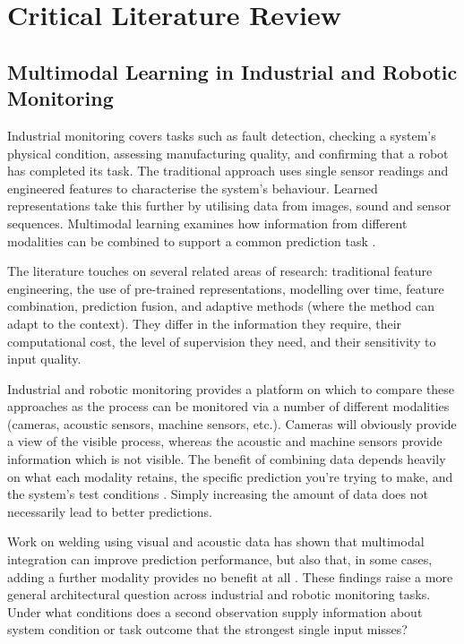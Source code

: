 \chapter{Critical Literature Review}

\label{ch:literature}

\section*{Multimodal Learning in Industrial and Robotic Monitoring}


Industrial monitoring covers tasks such as fault detection, checking a system's physical condition,
assessing manufacturing quality, and confirming that a robot has completed its task. The traditional
approach uses single sensor readings and engineered features to characterise the system's behaviour.
Learned representations take this further by utilising data from images, sound and sensor sequences.
Multimodal learning examines how information from different modalities can be combined to support a
common prediction task \parencite{baltrusaitis_multimodal_2019,huo_multisensor_2022,thoduka_multimodal_2024}.

The literature touches on several related areas of research: traditional feature engineering, the
use of pre-trained representations, modelling over time, feature combination, prediction fusion, and
adaptive methods (where the method can adapt to the context). They differ in the information they
require, their computational cost, the level of supervision they need, and their sensitivity to
input quality.

Industrial and robotic monitoring provides a platform on which to compare these approaches as the
process can be monitored via a number of different modalities (cameras, acoustic sensors, machine
sensors, etc.). Cameras will obviously provide a view of the visible process, whereas the acoustic
and machine sensors provide information which is not visible. The benefit of combining data depends
heavily on what each modality retains, the specific prediction you're trying to make, and the
system's test conditions \parencite{wang_what_2020,hua_anti-interference_2026,goodarzi_deep_2023}. Simply increasing the
amount of data does not necessarily lead to better predictions.

Work on welding using visual and acoustic data has shown that multimodal integration can improve prediction performance, but also that, in some cases, adding a further modality provides no benefit at all \parencite{fan_dmaw_2026,hua_anti-interference_2026}. These findings raise a more general architectural question across industrial and robotic monitoring tasks. Under what conditions does a second observation supply information about system condition or task outcome that the strongest single input misses?

